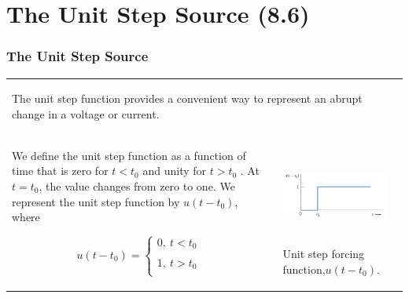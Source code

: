 \documentclass[aspectratio=169]{beamer}
\begin{document}
\section{The Unit Step Source (8.6)}
\begin{frame}[fragile]
	\frametitle{The Unit Step Source}
	\begin{tabular}{ll}
	\begin{columns}
		\begin{column}{1\textwidth}  %
The unit step function provides a convenient way to represent an
abrupt change in a voltage or current. \newline
		\end{column}
	\end{columns} \\
	\begin{columns}
\small			\begin{column}{0.5\textwidth}  %
We define the unit step function as a function of time that is zero
for $t < t_0$ and unity for $t > t_0$ . At $t=t_0$, the value changes from zero to
one. We represent the unit step function by $u(t-t_0)$, where


 $$
	    u(t-t_0)=
	    \begin{cases}
	    0, \ t<t_0 \\
	    \\
	    1, \ t>t_0\\
	    \end{cases}
	    $$
		\end{column}
		\begin{column}{0.5\textwidth}  %
 \includegraphics[height=3.2cm]{figure19.png} \newline
\small Unit step forcing function,$ u(t-t_0)$.
		\end{column}
	\end{columns}
\end{tabular}
\end{frame}
\end{document}
